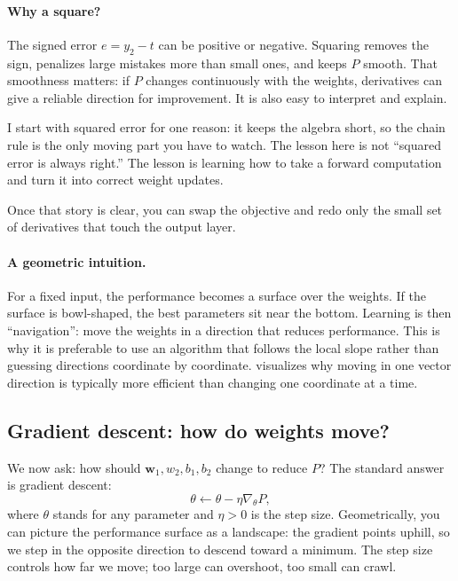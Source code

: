 \paragraph{Why a square?}
The signed error \(e=y_2-t\) can be positive or negative. Squaring removes the sign, penalizes large mistakes more than small ones, and keeps \(P\) smooth. That smoothness matters: if \(P\) changes continuously with the weights, derivatives can give a reliable direction for improvement. It is also easy to interpret and explain.

\begin{tcolorbox}[summarybox, title={Author's note: one objective is enough for the first derivation}]
I start with squared error for one reason: it keeps the algebra short, so the chain rule is the only moving part you have to watch. The lesson here is not ``squared error is always right.'' The lesson is learning how to take a forward computation and turn it into correct weight updates.

Once that story is clear, you can swap the objective and redo only the small set of derivatives that touch the output layer.
\end{tcolorbox}

\paragraph{A geometric intuition.}
For a fixed input, the performance becomes a surface over the weights. If the surface is bowl-shaped, the best parameters sit near the bottom. Learning is then ``navigation'': move the weights in a direction that reduces performance. This is why it is preferable to use an algorithm that follows the local slope rather than guessing directions coordinate by coordinate.  visualizes why moving in one vector direction is typically more efficient than changing one coordinate at a time.

\subsection{Gradient descent: how do weights move?}
\label{sec:mlp_gradient_descent_how_do_weights_move}

We now ask: how should $\mathbf{w}_1, w_2, b_1, b_2$ change to reduce $P$? The standard answer is gradient descent:
\begin{equation}
\theta \leftarrow \theta - \eta \nabla_{\theta} P,
\label{eq:gd_update}
\end{equation}
where $\theta$ stands for any parameter and $\eta>0$ is the step size. Geometrically, you can picture the performance surface as a landscape: the gradient points uphill, so we step in the opposite direction to descend toward a minimum. The step size controls how far we move; too large can overshoot, too small can crawl.

